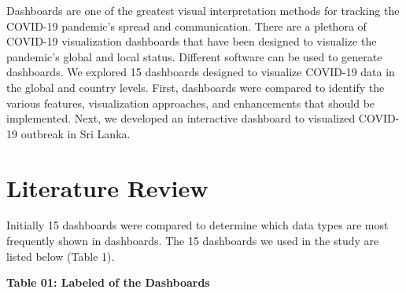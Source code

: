 \documentclass[
]{article}
\begin{document}
Dashboards are one of the greatest visual interpretation methods for
tracking the COVID-19 pandemic's spread and communication. There are a
plethora of COVID-19 visualization dashboards that have been designed to
visualize the pandemic's global and local status. Different software can
be used to generate dashboards. We explored 15 dashboards designed to
visualize COVID-19 data in the global and country levels. First,
dashboards were compared to identify the various features, visualization
approaches, and enhancements that should be implemented. Next, we
developed an interactive dashboard to visualized COVID-19 outbreak in
Sri Lanka.

\hypertarget{literature-review}{%
\section{Literature Review}\label{literature-review}}

Initially 15 dashboards were compared to determine which data types are
most frequently shown in dashboards. The 15 dashboards we used in the
study are listed below (Table 1).

\textbf{Table 01: Labeled of the Dashboards}
\end{document}
